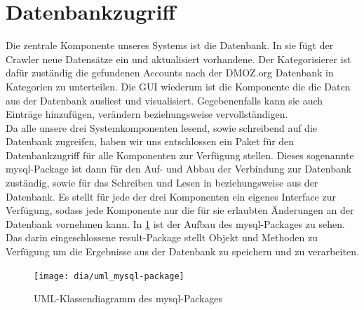 \section{Datenbankzugriff}\label{sec:datenbankzugriff}
Die zentrale Komponente unseres Systems ist die Datenbank. In sie fügt der Crawler neue Datensätze ein und aktualisiert vorhandene. Der Kategorisierer ist dafür zuständig die gefundenen Accounts nach der DMOZ.org Datenbank in Kategorien zu unterteilen. Die GUI wiederum ist die Komponente die die Daten aus der Datenbank ausliest und visualisiert. Gegebenenfalls kann sie auch Einträge hinzufügen, verändern beziehungsweise vervollständigen.
\\Da alle unsere drei Systemkomponenten lesend, sowie schreibend auf die Datenbank zugreifen, haben wir uns entschlossen ein Paket für den Datenbankzugriff für alle Komponenten zur Verfügung stellen. Dieses sogenannte mysql-Package ist dann für den Auf- und Abbau der Verbindung zur Datenbank zuständig, sowie für das Schreiben und Lesen in beziehungsweise aus der Datenbank. Es stellt für jede der drei Komponenten ein eigenes Interface zur Verfügung, sodass jede Komponente nur die für sie erlaubten Änderungen an der Datenbank vornehmen kann.
In \cref{fig:mysql-package} ist der Aufbau des mysql-Packages zu sehen. Das darin eingeschlossene result-Package stellt Objekt und Methoden zu Verfügung um die Ergebnisse aus der Datenbank zu speichern und zu verarbeiten.\\

\begin{figure}[h!]
	\centering
	\texttt{[image: dia/uml\_mysql-package]}
	\caption{UML-Klassendiagramm des mysql-Packages}
	\label{fig:mysql-package}
\end{figure}

